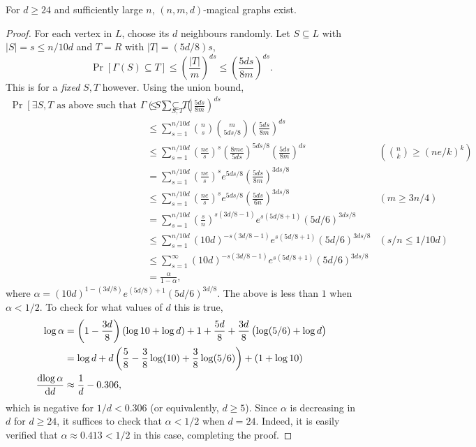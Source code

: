 			\begin{ftheo}
				For $d\ge 24$ and sufficiently large $n$, $(n,m,d)$-magical graphs exist.
			\end{ftheo}
			\begin{proof}
				For each vertex in $L$, choose its $d$ neighbours randomly. Let $S \subseteq L$ with $|S| = s \le n/10d$ and $T = R$ with $|T| = (5d/8)s$,
				\[ \Pr\left[ \Gamma(S) \subseteq T \right] \le \left( \frac{|T|}{m} \right)^{ds} \le \left( \frac{5ds}{8m} \right)^{ds}. \]
				This is for a \emph{fixed} $S,T$ however. Using the union bound,
				\begin{align*}
					\Pr\left[ \text{$\exists S,T$ as above such that }\Gamma(S) \subseteq T \right] &\le \sum_{S,T} \left( \frac{5ds}{8m} \right)^{ds} \\
						&\le  \sum_{s=1}^{n/10d} \binom{n}{s} \binom{m}{5ds/8} \left(\frac{5ds}{8m}\right)^{ds} \\
						&\le \sum_{s=1}^{n/10d} \left(\frac{ne}{s}\right)^s \left(\frac{8me}{5ds}\right)^{5ds/8} \left( \frac{5ds}{8m} \right)^{ds} & \left(\binom{n}{k} \ge (ne/k)^k\right) \\ %
						&= \sum_{s=1}^{n/10d} \left( \frac{ne}{s} \right)^s e^{5ds/8} \left(\frac{5ds}{8m}\right)^{3ds/8} \\
						&\le \sum_{s=1}^{n/10d} \left( \frac{ne}{s} \right)^s e^{5ds/8} \left(\frac{5ds}{6n}\right)^{3ds/8} & (m\ge 3n/4) \\
						&= \sum_{s=1}^{n/10d} \left(\frac{s}{n}\right)^{s(3d/8 - 1)} e^{s(5d/8+1)} \left(5d/6\right)^{3ds/8} \\
						&\le \sum_{s=1}^{n/10d}  (10d)^{-s(3d/8-1)} e^{s(5d/8+1)} \left(5d/6\right)^{3ds/8} & (s/n \le 1/10d) \\
						&\le \sum_{s=1}^{\infty}  (10d)^{-s(3d/8-1)} e^{s(5d/8+1)} \left(5d/6\right)^{3ds/8} \\
						&= \frac{\alpha}{1-\alpha},
				\end{align*}
				where $\alpha = (10d)^{1-(3d/8)} e^{(5d/8)+1} (5d/6)^{3d/8}$. The above is less than $1$ when $\alpha < 1/2$. To check for what values of $d$ this is true,
				\begin{align*}
					\log \alpha &= \left(1-\frac{3d}{8}\right)(\log 10 + \log d) + 1 + \frac{5d}{8} + \frac{3d}{8}\left(\log(5/6) + \log d\right) \\
						&= \log d + d \left( \frac{5}{8} - \frac{3}{8}\log(10) + \frac{3}{8}\log(5/6) \right) + (1+\log 10) \\
					\frac{\dif \log \alpha}{\dif d} &\approx \frac{1}{d} - 0.306,
				\end{align*}
				which is negative for $1/d < 0.306$ (or equivalently, $d \ge 5$). Since $\alpha$ is decreasing in $d$ for $d \ge 24$, it suffices to check that $\alpha < 1/2$ when $d=24$. Indeed, it is easily verified that $\alpha \approx 0.413 < 1/2$ in this case, completing the proof.
			\end{proof}

